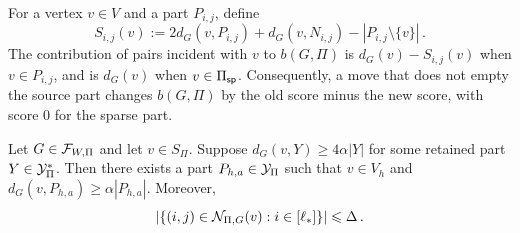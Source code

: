 For a vertex $v\in V$ and a part $P_{i,j}$, define
\begin{equation}\label{eqn:sub-placement-score-K1k}
S_{i,j}(v):=2d_G(v,P_{i,j})+d_G(v,N_{i,j})-|P_{i,j}\setminus\{v\}|\,.
\end{equation}
The contribution of pairs incident with $v$ to $b(G,\Pi)$ is $d_G(v)-S_{i,j}(v)$ when $v\in P_{i,j}$, and is $d_G(v)$ when $v\in\Pi_{\mathsf{sp}}$. Consequently, a move that does not empty the source part changes $b(G,\Pi)$ by the old score minus the new score, with score $0$ for the sparse part.

\begin{lemma}\label{lemma:sparse-retained-row-budget-K1k}
Let $G\in{\mathcal F}_{W,\Pi}$ and let $v\in S_\Pi$. Suppose $d_G(v,Y)\geq4\alpha |Y|$ for some retained part $Y\in{\mathcal Y}^\ast_\Pi$. Then there exists a part $P_{h,a}\in{\mathcal Y}_\Pi$ such that $v\in V_h$ and $d_G(v,P_{h,a})\geq\alpha |P_{h,a}|$. Moreover,
$$|\{(i,j)\in{\mathcal N}_{\Pi,G}(v):i\in[\ell_\ast]\}|\leqslant\Delta\,.$$
\end{lemma}
